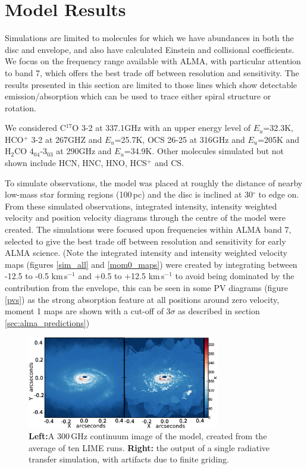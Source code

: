 \documentclass[useAMS,usenatbib]{mn2e}
\begin{document}
\section{Model Results} \label{sec:model_results}

Simulations are limited to molecules for which we have abundances in both the disc and envelope, and also have calculated Einstein and collisional coefficients. We focus on the frequency range available with ALMA, with particular attention to band 7, which offers the best trade off between resolution and sensitivity. The results presented in this section are limited to those lines which show detectable emission/absorption which can be used to trace either spiral structure or rotation.\newline

We considered C$^{17}$O 3-2 at 337.1GHz with an upper energy level of $E_u$=32.3K, HCO$^+$ 3-2 at 267GHZ and $E_u$=25.7K, OCS 26-25 at 316GHz and $E_u$=205K and H$_2$CO $4_{04}$-3$_{03}$ at 290GHz and $E_u$=34.9K. Other molecules simulated but not shown include HCN, HNC, HNO, HCS$^+$ and CS.\newline

To simulate observations, the model was placed at roughly the distance of nearby low-mass star forming regions (100$\,$pc) and the disc is inclined at 30$^\circ$ to edge on. From these simulated observations, integrated intensity, intensity weighted velocity and position velocity diagrams through the centre of the model were created.
The simulations were focused upon frequencies within ALMA band 7, selected to give the best trade off between resolution and sensitivity for early ALMA science.
(Note the integrated intensity and intensity weighted velocity maps (figures \ref{sim_all} and \ref{mom0_maps}) were created by integrating between -12.5 to -0.5 km$\,$s$^{-1}$ and +0.5 to +12.5 km$\,$s$^{-1}$ to avoid being dominated by the contribution from the envelope, this can be seen in some PV diagrams  (figure \ref{pvs}) as the strong absorption feature at all positions around zero velocity, moment 1 maps are shown with a cut-off of 3$\sigma$ as described in section \ref{sec:alma_predictions})\newline

\begin{figure}
 \includegraphics[width=84mm]{Figures/sim/continuum.eps}
 \caption{{\bf Left:}A 300$\,$GHz continuum image of the model, created from the average of ten LIME runs. {\bf Right:} the output of a single radiative transfer simulation, with artifacts due to finite griding.}
 \label{averages}
\end{figure}
\end{document}
